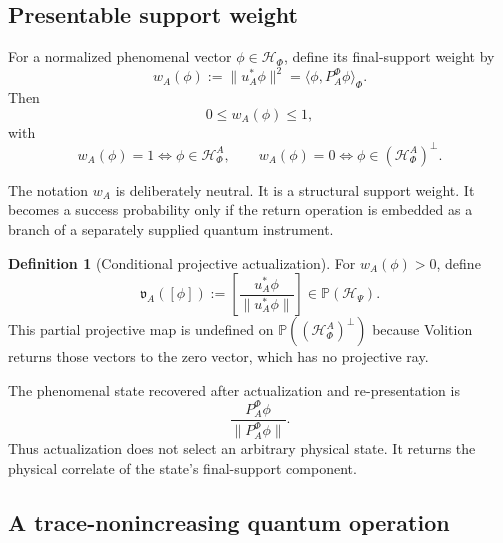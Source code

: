 \documentclass[11pt,reqno]{scrartcl}
\newcommand{\scrHP}{\mathscr H_{\Psi}}
\newcommand{\scrHF}{\mathscr H_{\Phi}}
\newcommand{\polA}{u_A}
\newcommand{\inner}[2]{\langle #1,#2\rangle}
\newcommand{\actHF}{\mathscr H_{\Phi}^{A}}
\newcommand{\suppProjF}{P_{A}^{\Phi}}
\newcommand{\defectHF}{(\mathscr H_{\Phi}^{A})^{\perp}}
\newcommand{\presentWeight}{w_{A}}
\theoremstyle{plain}
\theoremstyle{definition}
\newtheorem{definition}[definition]{Definition}
\theoremstyle{remark}
\begin{document}
\subsection{Presentable support weight}

For a normalized phenomenal vector $\phi\in\scrHF$, define its final-support
weight by
\begin{equation}
  \boxed{
  \presentWeight(\phi)
  :=\|\polA^*\phi\|^2
  =\inner{\phi}{\suppProjF\phi}_{\Phi}.}
  \label{eq:pure-actualization-weight}
\end{equation}
Then
\begin{equation}
  0\leq\presentWeight(\phi)\leq1,
\end{equation}
with
\begin{equation}
  \presentWeight(\phi)=1
  \iff \phi\in\actHF,
  \qquad
  \presentWeight(\phi)=0
  \iff \phi\in\defectHF.
  \label{eq:actualization-weight-extremes}
\end{equation}

The notation $w_A$ is deliberately neutral.  It is a structural support
weight.  It becomes a success probability only if the return operation is
embedded as a branch of a separately supplied quantum instrument.

\begin{definition}[Conditional projective actualization]
\label{def:conditional-projective-actualization}
For $\presentWeight(\phi)>0$, define
\begin{equation}
  \boxed{
  \mathfrak v_A([\phi])
  :=\left[
  \frac{\polA^*\phi}{\|\polA^*\phi\|}
  \right]
  \in\mathbb P(\scrHP).}
  \label{eq:projective-actualization-map}
\end{equation}
This partial projective map is undefined on
$\mathbb P(\defectHF)$ because Volition returns those vectors to the zero
vector, which has no projective ray.
\end{definition}

The phenomenal state recovered after actualization and re-presentation is
\begin{equation}
  \frac{\suppProjF\phi}{\|\suppProjF\phi\|}.
  \label{eq:re-presented-actualized-state}
\end{equation}
Thus actualization does not select an arbitrary physical state.  It returns
the physical correlate of the state's final-support component.

\subsection{A trace-nonincreasing quantum operation}
\end{document}
